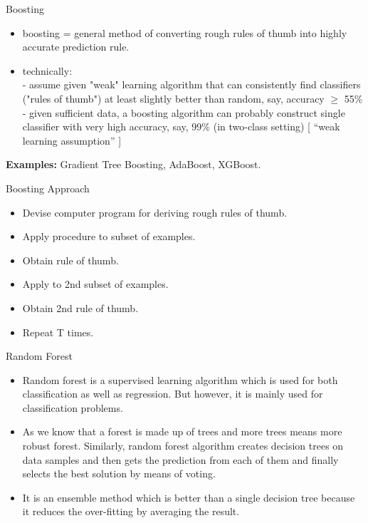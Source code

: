 \documentclass{beamer}
\begin{document}
\begin{frame}{Boosting}
	\begin{flushleft}
		\begin{itemize}
			\item boosting = general method of converting rough rules of thumb into highly accurate prediction rule.
			\item technically:\\
			- assume given "weak" learning algorithm that can consistently find classifiers ("rules of thumb") at least slightly better than random, say, accuracy $\geq$ 55\% \\
			- given sufficient data, a boosting algorithm can probably construct single classifier with very high accuracy, say, 99\%
(in two-class setting) [ “weak learning assumption” ]
		\end{itemize}
		\vspace{10pt}
\textbf{Examples:} Gradient Tree Boosting, AdaBoost, XGBoost.
	\end{flushleft}
\end{frame}
\begin{frame}{Boosting Approach}
	\begin{flushleft}
		\begin{itemize}
			\item Devise computer program for deriving rough rules of thumb.
			\item Apply procedure to subset of examples.
			\item Obtain rule of thumb.
			\item Apply to 2nd subset of examples.
			\item Obtain 2nd rule of thumb.
			\item Repeat T times.
		\end{itemize}
	\end{flushleft}
\end{frame}

\begin{frame}{Random Forest}
\begin{flushleft}
	\begin{itemize}
		\item Random forest is a supervised learning algorithm which is used for both classification as well as regression. But however, it is mainly used for classification problems.
		\item As we know that a forest is made up of trees and more trees means more robust forest. Similarly, random forest algorithm creates decision trees on data samples and then gets the prediction from each of them and finally selects the best solution by means of voting.
		\item It is an ensemble method which is better than a single decision tree because it reduces the over-fitting by averaging the result.
	\end{itemize}
\end{flushleft}
\end{frame}
\end{document}
